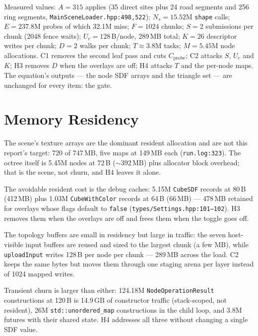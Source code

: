 \documentclass[11pt,a4paper]{article}
\begin{document}
Measured values: $A = 315$ applies (35 direct sites plus 24 road segments
and 256 ring segments, \texttt{MainSceneLoader.hpp:498,522});
$N_s = 15.52$M \texttt{shape} calls; $E = 237.8$M probes of which 32.1M miss;
$F = 1024$ chunks; $S = 2$ submissions per chunk (2048 fence waits);
$U_c = 128$\,B/node, 289\,MB total; $K = 26$ descriptor writes per chunk;
$D = 2$ walks per chunk; $T \approx 3.8$M tasks; $M = 5.45$M node
allocations. C1 removes the second leaf pass and cuts $C_{\mathrm{probe}}$;
C2 attacks $S$, $U_c$ and $K$; H3 removes $D$ when the overlays are off; H4
attacks $T$ and the per-node maps. The equation's outputs --- the node SDF
arrays and the triangle set --- are unchanged for every item: the gate.

\section{Memory Residency}

The scene's texture arrays are the dominant resident allocation and are not
this report's target: 720 of 747\,MB, five maps at 149\,MB each
(\texttt{run.log:323}). The octree itself is 5.45M nodes at 72\,B
($\sim$392\,MB) plus allocator block overhead; that is the scene, not churn,
and H4 leaves it alone.

The avoidable resident cost is the debug caches: 5.15M \texttt{CubeSDF}
records at 80\,B (412\,MB) plus 1.03M \texttt{CubeWithColor} records at 64\,B
(66\,MB) --- 478\,MB retained for overlays whose flags default to
\texttt{false} (\texttt{types/Settings.hpp:101--102}). H3 removes them when
the overlays are off and frees them when the toggle goes off.

The topology buffers are small in residency but large in traffic: the seven
host-visible input buffers are reused and sized to the largest chunk (a few
MB), while \texttt{uploadInput} writes 128\,B per node per chunk --- 289\,MB
across the load. C2 keeps the same bytes but moves them through one staging
arena per layer instead of 1024 mapped writes.

Transient churn is larger than either: 124.18M \texttt{NodeOperationResult}
constructions at 120\,B is 14.9\,GB of constructor traffic (stack-scoped, not
resident), 26M \texttt{std::unordered\_map} constructions in the child loop,
and 3.8M futures with their shared state. H4 addresses all three without
changing a single SDF value.
\end{document}
